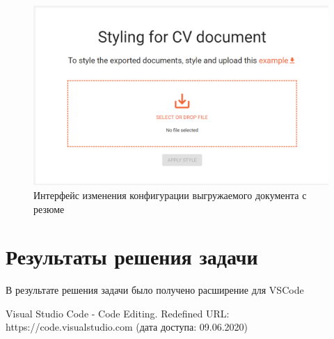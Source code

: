 \documentclass[a4paper,12pt]{diplom}
\begin{document}
\begin{figure}[!ht]
	\centering
	\includegraphics[width=1\textwidth]{resources/doc.png}
	\caption{Интерфейс изменения конфигурации выгружаемого документа с резюме}
	\label{20}
\end{figure}

\chapter{Результаты решения задачи}

В результате решения задачи было получено расширение для VSCode


\renewcommand{\bibname}{Список литературы} 
\begin{thebibliography}{9}

Visual Studio Code - Code Editing. Redefined
URL: https://code.visualstudio.com
(дата доступа: 09.06.2020)

\end{thebibliography}
\end{document}

